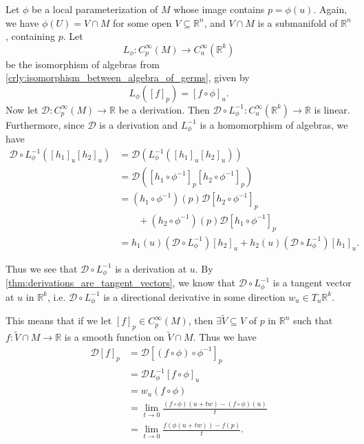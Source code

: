 \documentclass[notoc,notitlepage]{tufte-book}
\begin{document}
Let $\phi$ be a local parameterization of $M$ whose image contains $p = \phi(u)$.
Again, we have $\phi(U) = V \cap M$ for some open $V \subseteq \mathbb{R}^n$,
and $V \cap M$ is a submanifold of $\mathbb{R}^n$, containing $p$. Let
\begin{equation*}
  L_{\phi} : C_p^\infty(M) \to C_u^\infty(\mathbb{R}^k)
\end{equation*}
be the isomorphism of algebras from
\cref{crly:isomorphism_between_algebra_of_germs}, given by
\begin{equation*}
  L_{\phi}([f]_p) = [ f \circ \phi ]_u.
\end{equation*}
Now let $\mathcal{D} : C_p^\infty (M) \to \mathbb{R}$ be a derivation. Then
$\mathcal{D} \circ L_\phi^{-1} : C_u^\infty(\mathbb{R}^k) \to \mathbb{R}$ is
linear. Furthermore, since $\mathcal{D}$ is a derivation and $L_\phi^{-1}$ is a
homomorphism of algebras, we have
\begin{align*}
  \mathcal{D} \circ L_{\phi}^{-1} ([h_1]_u [h_2]_u)
  &= \mathcal{D}(L_{\phi}^{-1}([h_1]_u[h_2]_u)) \\
  &= \mathcal{D}([h_1 \circ \phi^{-1}]_p [h_2 \circ \phi^{-1}]_p) \\
  &= (h_1 \circ \phi^{-1})(p) \mathcal{D}[h_2 \circ \phi^{-1}]_p \\
  &\qquad + (h_2 \circ \phi^{-1})(p) \mathcal{D}[h_1 \circ \phi^{-1}]_p \\
  &= h_1(u) (\mathcal{D} \circ L_{\phi}^{-1})[h_2]_u
    + h_2(u) (\mathcal{D} \circ L_{\phi}^{-1})[h_1]_u.
\end{align*}

Thus we see that $\mathcal{D} \circ L_\phi^{-1}$ is a derivation at $u$.
By \cref{thm:derivations_are_tangent_vectors}, we know that $\mathcal{D} \circ
L_\phi^{-1}$ is a tangent vector at $u$ in $\mathbb{R}^k$, i.e. $\mathcal{D}
\circ L_{\phi}^{-1}$ is a directional derivative in some direction $w_u \in T_u
\mathbb{R}^k$.

This means that if we let $[f]_p \in C_p^\infty(M)$, then $\exists \tilde{V}
\subseteq V$ of $p$ in $\mathbb{R}^n$ such that $f : \tilde{V} \cap M \to
\mathbb{R}$ is a smooth function on $\tilde{V} \cap M$. Thus we have
\begin{align*}
  \mathcal{D}[f]_p
  &= \mathcal{D}[(f \circ \phi) \circ \phi^{-1}]_p \\
  &= \mathcal{D}L_{\phi}^{-1}[f \circ \phi]_u \\
  &= w_u (f \circ \phi) \\
  &= \lim_{t \to 0} \frac{(f \circ \phi)(u + tw) - (f \circ \phi)(u)}{t} \\
  &= \lim_{t \to 0} \frac{f(\phi(u + tw)) - f(p)}{t}.
\end{align*}
\end{document}
